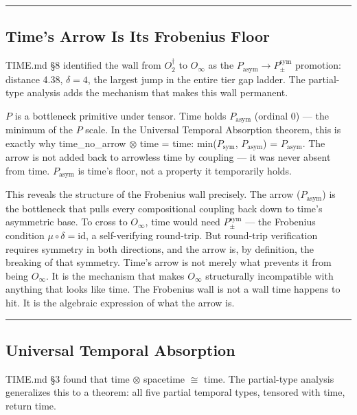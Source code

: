 \documentclass[12pt,a4paper]{article}
\newcommand{\pilcrow}{\S}
\begin{document}
\begin{center}
\rule{0.5\textwidth}{0.4pt}
\end{center}

\subsection{Time's Arrow Is Its Frobenius Floor}

TIME.md \pilcrow{}8 identified the wall from $O_2^\dagger$ to $O_{\infty}$ as the $P_\text{asym} \to P_{\pm}^{\text{sym}}$ promotion: distance 4.38, $\delta = 4$, the largest jump in the entire tier gap ladder. The partial-type analysis adds the mechanism that makes this wall permanent.

$P$ is a bottleneck primitive under tensor. Time holds $P_\text{asym}$ (ordinal 0) --- the minimum of the $P$ scale. In the Universal Temporal Absorption theorem, this is exactly why time\_no\_arrow $\otimes$ time = time: min($P_\text{sym}$, $P_\text{asym}$) = $P_\text{asym}$. The arrow is not added back to arrowless time by coupling --- it was never absent from time. $P_\text{asym}$ is time's floor, not a property it temporarily holds.

This reveals the structure of the Frobenius wall precisely. The arrow ($P_\text{asym}$) is the bottleneck that pulls every compositional coupling back down to time's asymmetric base. To cross to $O_{\infty}$, time would need $P_{\pm}^{\text{sym}}$ --- the Frobenius condition $\mu \circ \delta = \text{id}$, a self-verifying round-trip. But round-trip verification requires symmetry in both directions, and the arrow is, by definition, the breaking of that symmetry. Time's arrow is not merely what prevents it from being $O_{\infty}$. It is the mechanism that makes $O_{\infty}$ structurally incompatible with anything that looks like time. The Frobenius wall is not a wall time happens to hit. It is the algebraic expression of what the arrow is.

\begin{center}
\rule{0.5\textwidth}{0.4pt}
\end{center}

\subsection{Universal Temporal Absorption}

TIME.md \pilcrow{}3 found that time $\otimes$ spacetime $\cong$ time. The partial-type analysis generalizes this to a theorem: all five partial temporal types, tensored with time, return time.
\end{document}
